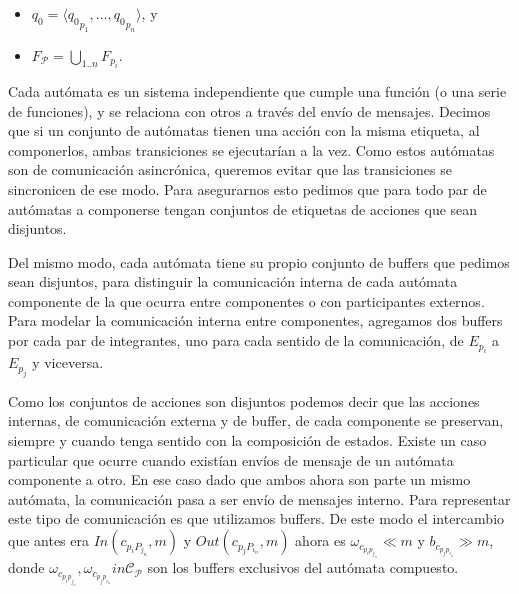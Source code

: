 \begin{definition}[Composición]
\begin{itemize}
\begin{enumerate}
 
\end{enumerate}
\item $q_0 = \langle {q_0}_{p_1}, \ldots, {q_0}_{p_n} \rangle$, y
\item $F_{\mathcal{P}} = \bigcup_{1..n} F_{p_i}$.
\end{itemize}

Cada autómata es un sistema independiente que cumple una función (o una serie de funciones), y se relaciona con otros a través del envío de mensajes. Decimos que si un conjunto de autómatas tienen una acción con la misma etiqueta, al componerlos, ambas transiciones se ejecutarían a la vez. Como estos autómatas son de comunicación asincrónica, queremos evitar que las transiciones se sincronicen de ese modo. Para asegurarnos esto pedimos que para todo par de autómatas a componerse tengan conjuntos de etiquetas de acciones que sean disjuntos. 

Del mismo modo, cada autómata tiene su propio conjunto de buffers que pedimos sean disjuntos, para distinguir la comunicación interna de cada autómata componente de la que ocurra entre componentes o con participantes externos. Para modelar la comunicación interna entre componentes, agregamos dos buffers por cada par de integrantes, uno para cada sentido de la comunicación, de $E_{p_i}$ a $E_{p_j}$ y viceversa.

Como los conjuntos de acciones son disjuntos podemos decir que las acciones internas, de comunicación externa y de buffer, de cada componente se preservan, siempre y cuando tenga sentido con la composición de estados. Existe un caso particular que ocurre cuando existían envíos de mensaje de un autómata componente a otro. En ese caso dado que ambos ahora son parte un mismo autómata, la comunicación pasa a ser envío de mensajes interno. Para representar este tipo de comunicación es que utilizamos buffers. De este modo el intercambio que antes era $In(c_{p_i P_j_n},m)$ y $Out(c_{p_j P_i_n},m)$ ahora es $\omega_{c_{p_i p_{j_n}}}  \ll m$ y $b_{c_{p_j p_{i_n}}}  \gg  m$, donde $ \omega_{c_{p_i p_{j_n}}}, \omega_{c_{p_j p_{i_n}}} in \mathcal{C}_{\mathcal{P}} $ son los buffers exclusivos del autómata compuesto. 


\end{definition}
